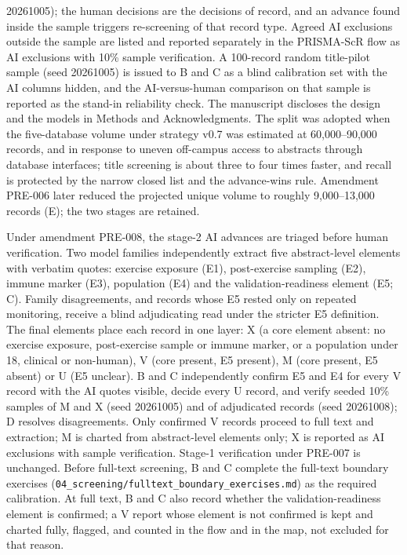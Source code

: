 \documentclass[
  11pt,
  a4paper,
]{article}
\begin{document}
20261005); the human decisions are the decisions of record, and an
advance found inside the sample triggers re-screening of that record
type. Agreed AI exclusions outside the sample are listed and reported
separately in the PRISMA-ScR flow as AI exclusions with 10\% sample
verification. A 100-record random title-pilot sample (seed 20261005) is
issued to B and C as a blind calibration set with the AI columns hidden,
and the AI-versus-human comparison on that sample is reported as the
stand-in reliability check. The manuscript discloses the design and the
models in Methods and Acknowledgments. The split was adopted when the
five-database volume under strategy v0.7 was estimated at 60,000--90,000
records, and in response to uneven off-campus access to abstracts
through database interfaces; title screening is about three to four
times faster, and recall is protected by the narrow closed list and the
advance-wins rule. Amendment PRE-006 later reduced the projected unique
volume to roughly 9,000--13,000 records (E); the two stages are
retained.

Under amendment PRE-008, the stage-2 AI advances are triaged before
human verification. Two model families independently extract five
abstract-level elements with verbatim quotes: exercise exposure (E1),
post-exercise sampling (E2), immune marker (E3), population (E4) and the
validation-readiness element (E5; C). Family disagreements, and records
whose E5 rested only on repeated monitoring, receive a blind
adjudicating read under the stricter E5 definition. The final elements
place each record in one layer: X (a core element absent: no exercise
exposure, post-exercise sample or immune marker, or a population under
18, clinical or non-human), V (core present, E5 present), M (core
present, E5 absent) or U (E5 unclear). B and C independently confirm E5
and E4 for every V record with the AI quotes visible, decide every U
record, and verify seeded 10\% samples of M and X (seed 20261005) and of
adjudicated records (seed 20261008); D resolves disagreements. Only
confirmed V records proceed to full text and extraction; M is charted
from abstract-level elements only; X is reported as AI exclusions with
sample verification. Stage-1 verification under PRE-007 is unchanged.
Before full-text screening, B and C complete the full-text boundary
exercises (\texttt{04\_screening/fulltext\_boundary\_exercises.md}) as
the required calibration. At full text, B and C also record whether the
validation-readiness element is confirmed; a V report whose element is
not confirmed is kept and charted fully, flagged, and counted in the
flow and in the map, not excluded for that reason.
\end{document}
